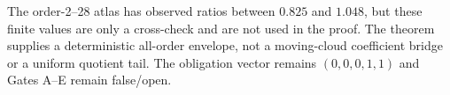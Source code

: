 \documentclass[11pt]{article}
\begin{document}
The order-2--28 atlas has observed ratios between $0.825$ and $1.048$, but
these finite values are only a cross-check and are not used in the proof.
The theorem supplies a deterministic all-order envelope, not a moving-cloud
coefficient bridge or a uniform quotient tail.  The obligation vector remains
$(0,0,0,1,1)$ and Gates A--E remain false/open.


\end{document}
